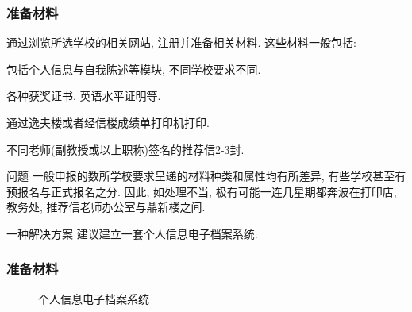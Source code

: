 \documentclass[usenames,dvipsnames]{beamer}
\begin{document}
    \begin{frame}
      \frametitle{准备材料}
      通过浏览所选学校的相关网站, 注册并准备相关材料. 这些材料一般包括:

      \begin{description}[leftmargin=!,labelwidth=\widthof{\bfseries 个人简历}]
        \small
        \item[个人简历] 包括个人信息与自我陈述等模块, 不同学校要求不同.
        \item[相关证书] 各种获奖证书, 英语水平证明等.
        \item[成绩单]   通过逸夫楼或者经信楼成绩单打印机打印. 
        \item[推荐信]   不同老师(副教授或以上职称)签名的推荐信2-3封.
      \end{description}

      \begin{alertblock}{问题}
        一般申报的数所学校要求呈递的材料种类和属性均有所差异, 有些学校甚至有预报名与正式报名之分. 因此, 如处理不当, 极有可能一连几星期都奔波在打印店, 教务处, 推荐信老师办公室与鼎新楼之间.
      \end{alertblock}

      \begin{block}{一种解决方案}
        建议建立一套个人信息电子档案系统.
      \end{block}
    \end{frame} 

    \begin{frame}
      \frametitle{准备材料}
      \begin{figure} 
        \caption{个人信息电子档案系统}
      \end{figure} 
    \end{frame} 
\end{document}
